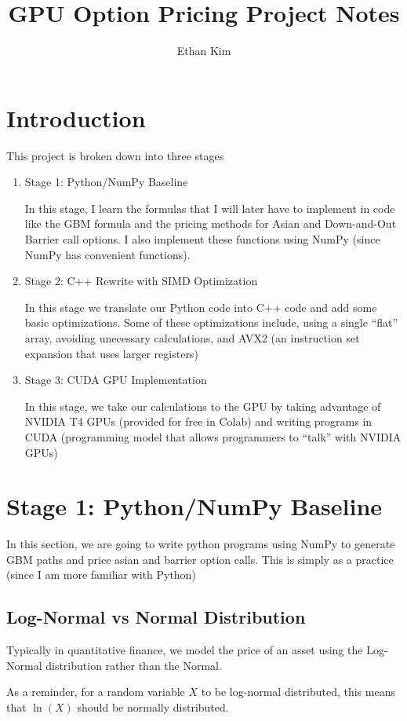 \documentclass{article}
\title{GPU Option Pricing Project Notes}
\author{Ethan Kim}
\begin{document}
\maketitle
\section*{Introduction}
This project is broken down into three stages
\begin{enumerate}
    \item Stage 1: Python/NumPy Baseline
    
    In this stage, I learn the formulas that I will later have to implement in code like the GBM formula and the pricing methods for Asian and Down-and-Out Barrier call options.
    I also implement these functions using NumPy (since NumPy has convenient functions). 
    \item Stage 2: C++ Rewrite with SIMD Optimization
    
    In this stage we translate our Python code into C++ code and add some basic optimizations.
    Some of these optimizations include, using a single ``flat'' array, avoiding unecessary calculations, and AVX2 (an instruction set expansion that uses larger registers)
    \item Stage 3: CUDA GPU Implementation
    
    In this stage, we take our calculations to the GPU by taking advantage of NVIDIA T4 GPUs (provided for free in Colab) and writing programs in CUDA (programming model that allows programmers to ``talk'' with NVIDIA GPUs)
\end{enumerate}

\newpage
\section*{Stage 1: Python/NumPy Baseline}
In this section, we are going to write python programs using NumPy to generate GBM paths and price asian and barrier option calls.
This is simply as a practice (since I am more familiar with Python)
\subsection*{Log-Normal vs Normal Distribution}
Typically in quantitative finance, we model the price of an asset using the Log-Normal distribution rather than the Normal.

As a reminder, for a random variable \(X\) to be log-normal distributed, this means that \(\ln(X)\) should be normally distributed. 
\end{document}
